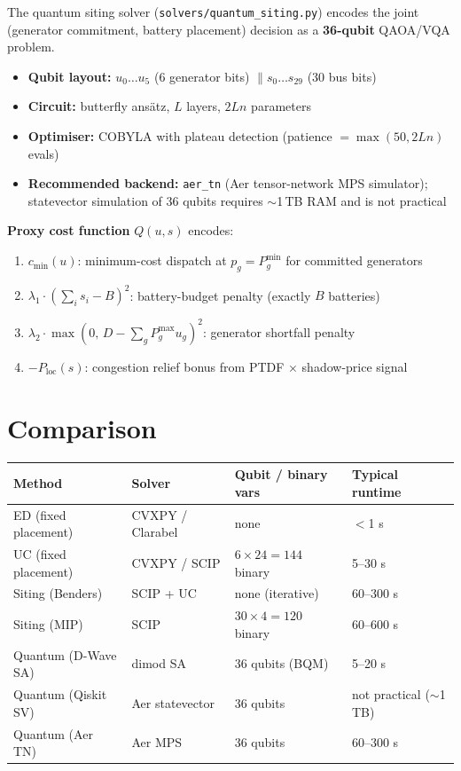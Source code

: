 \documentclass[11pt,a4paper]{article}
\begin{document}
The quantum siting solver (\texttt{solvers/quantum\_siting.py}) encodes the joint
(generator commitment, battery placement) decision as a \textbf{36-qubit} QAOA/VQA problem.

\begin{itemize}
  \item \textbf{Qubit layout:} $u_0 \ldots u_5$ (6 generator bits) $\| s_0 \ldots s_{29}$ (30 bus bits)
  \item \textbf{Circuit:} butterfly ans\"{a}tz, $L$ layers, $2Ln$ parameters
  \item \textbf{Optimiser:} COBYLA with plateau detection (patience $= \max(50, 2Ln)$ evals)
  \item \textbf{Recommended backend:} \texttt{aer\_tn} (Aer tensor-network MPS simulator);
        statevector simulation of 36 qubits requires $\sim$1\,TB RAM and is not practical
\end{itemize}

\textbf{Proxy cost function} $Q(u, s)$ encodes:
\begin{enumerate}
  \item $c_{\min}(u)$: minimum-cost dispatch at $p_g = P_g^{\min}$ for committed generators
  \item $\lambda_1 \cdot (\sum_i s_i - B)^2$: battery-budget penalty (exactly $B$ batteries)
  \item $\lambda_2 \cdot \max(0,\, D - \sum_g P_g^{\max} u_g)^2$: generator shortfall penalty
  \item $-P_{\mathrm{loc}}(s)$: congestion relief bonus from PTDF $\times$ shadow-price signal
\end{enumerate}

\section{Comparison}

\begin{tabular}{@{}llll@{}}
\toprule
Method & Solver & Qubit / binary vars & Typical runtime \\
\midrule
ED (fixed placement) & CVXPY / Clarabel & none & $<$1 s \\
UC (fixed placement) & CVXPY / SCIP & $6 \times 24 = 144$ binary & 5--30 s \\
Siting (Benders) & SCIP + UC & none (iterative) & 60--300 s \\
Siting (MIP) & SCIP & $30 \times 4 = 120$ binary & 60--600 s \\
Quantum (D-Wave SA) & dimod SA & 36 qubits (BQM) & 5--20 s \\
Quantum (Qiskit SV) & Aer statevector & 36 qubits & not practical ($\sim$1\,TB) \\
Quantum (Aer TN) & Aer MPS & 36 qubits & 60--300 s \\
\bottomrule
\end{tabular}
\end{document}
